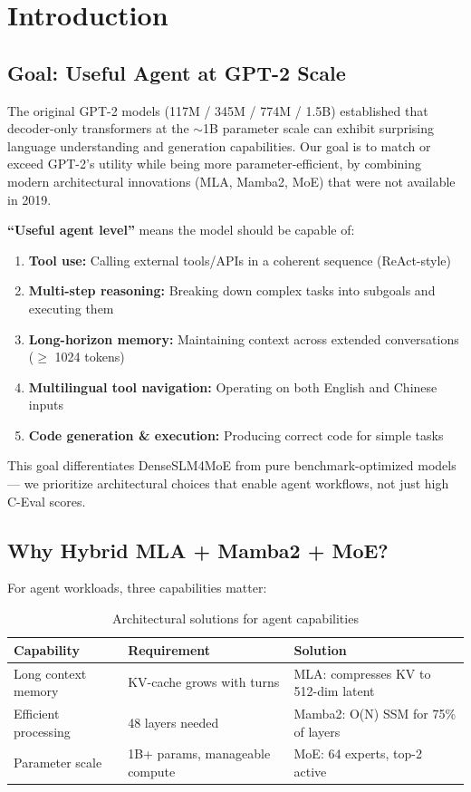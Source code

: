 \section{Introduction}
\label{sec:introduction}

\subsection{Goal: Useful Agent at GPT-2 Scale}

The original GPT-2 models \citep{gpt2} (117M / 345M / 774M / 1.5B) established that decoder-only transformers at the $\sim$1B parameter scale can exhibit surprising language understanding and generation capabilities. Our goal is to match or exceed GPT-2's utility while being more parameter-efficient, by combining modern architectural innovations (MLA, Mamba2, MoE) that were not available in 2019.

\textbf{``Useful agent level''} means the model should be capable of:

\begin{enumerate}
    \item \textbf{Tool use:} Calling external tools/APIs in a coherent sequence (ReAct-style) \citep{react}
    \item \textbf{Multi-step reasoning:} Breaking down complex tasks into subgoals and executing them
    \item \textbf{Long-horizon memory:} Maintaining context across extended conversations ($\ge$ 1024 tokens)
    \item \textbf{Multilingual tool navigation:} Operating on both English and Chinese inputs
    \item \textbf{Code generation \& execution:} Producing correct code for simple tasks
\end{enumerate}

This goal differentiates DenseSLM4MoE from pure benchmark-optimized models --- we prioritize architectural choices that enable agent workflows, not just high C-Eval scores.

\subsection{Why Hybrid MLA + Mamba2 + MoE?}

For agent workloads, three capabilities matter:

\begin{table}[h]
    \centering
    \caption{Architectural solutions for agent capabilities}
    \begin{tabular}{lll}
        \toprule
        \textbf{Capability} & \textbf{Requirement} & \textbf{Solution} \\
        \midrule
        Long context memory & KV-cache grows with turns & MLA: compresses KV to 512-dim latent \\
        Efficient processing & 48 layers needed & Mamba2: O(N) SSM for 75\% of layers \\
        Parameter scale & 1B+ params, manageable compute & MoE: 64 experts, top-2 active \\
        \bottomrule
    \end{tabular}
\end{table}

